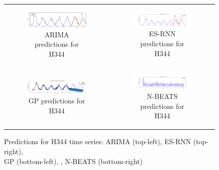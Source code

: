 \documentclass{article}
\begin{document}
\begin{figure}[!h]
  \centering
  \begin{tabular}[c]{cc}
    \begin{subfigure}[c]{0.6\textwidth}
      \includegraphics[width=\textwidth]{H344_ARIMA.eps}
      \caption{ARIMA predictions for H344}
      \label{fig:stackpred1}
    \end{subfigure}&
    \begin{subfigure}[c]{0.6\textwidth}
      \includegraphics[width=\textwidth]{H344_esrnn_time_series.png}
      \caption{ES-RNN predictions for H344}
      \label{fig:stackpred2}
    \end{subfigure}\\
    \begin{subfigure}[c]{0.5\textwidth}
      \includegraphics[width=\textwidth]{H344_GP_time_series.eps}
      \caption{GP predictions for H344}
      \label{fig:stackpred3}
    \end{subfigure}&
    \begin{subfigure}[c]{0.6\textwidth}
      \includegraphics[width=\textwidth]{H344_nbeats_time_series.png}
      \caption{N-BEATS predictions for H344}
      \label{fig:stackpred4}
    \end{subfigure}\\
  \end{tabular}    
  \caption{Predictions for H344 time series: ARIMA (top-left), ES-RNN (top-right), \\ GP (bottom-left), , N-BEATS (bottom-right)}
  \label{fig:stackpred}
\end{figure}
\end{document}
